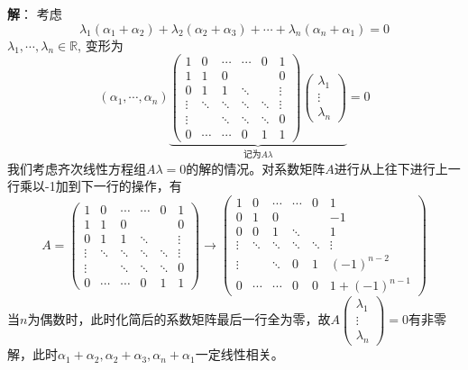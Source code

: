 {\bf 解}： 考虑
$$\lambda_1 (\alpha_1+\alpha_2) + \lambda_2 (\alpha_2+\alpha_3) + \cdots + \lambda_n (\alpha_n+\alpha_1) = 0$$
$\lambda_1, \cdots, \lambda_n\in\mathbb{R}$, 变形为
$$(\alpha_1, \cdots, \alpha_n)
\underbrace{\begin{pmatrix}
1 & 0 & \cdots & \cdots & 0 & 1 \\
1 & 1 & 0 & & & 0 \\
0 & 1 & 1 & \ddots & & \vdots \\
\vdots & \ddots & \ddots & \ddots & \ddots & \vdots \\
\vdots & & \ddots & \ddots & \ddots & 0 \\
0 & \cdots & \cdots & 0 & 1 & 1
\end{pmatrix}
\begin{pmatrix}
\lambda_1 \\ \vdots \\ \lambda_n
\end{pmatrix}
}_{\text{记为} A \lambda}= 0
$$
我们考虑齐次线性方程组$A\lambda = 0$的解的情况。对系数矩阵$A$进行从上往下进行上一行乘以-1加到下一行的操作，有
$$
A = \begin{pmatrix}
1 & 0 & \cdots & \cdots & 0 & 1 \\
1 & 1 & 0 & & & 0 \\
0 & 1 & 1 & \ddots & & \vdots \\
\vdots & \ddots & \ddots & \ddots & \ddots & \vdots \\
\vdots & & \ddots & \ddots & \ddots & 0 \\
0 & \cdots & \cdots & 0 & 1 & 1
\end{pmatrix}
\to
\begin{pmatrix}
1 & 0 & \cdots & \cdots & 0 & 1 \\
0 & 1 & 0 & & & -1 \\
0 & 0 & 1 & \ddots & & 1 \\
\vdots & \ddots & \ddots & \ddots & \ddots & \vdots \\
\vdots & & \ddots & 0 & 1 & (-1)^{n-2} \\
0 & \cdots & \cdots & 0 & 0 & 1 + (-1)^{n-1}
\end{pmatrix}
$$
当$n$为偶数时，此时化简后的系数矩阵最后一行全为零，故$A\begin{pmatrix}
\lambda_1 \\ \vdots \\ \lambda_n
\end{pmatrix} = 0$有非零解，此时$\alpha_1+\alpha_2, \alpha_2+\alpha_3, \alpha_n+\alpha_1$一定线性相关。

